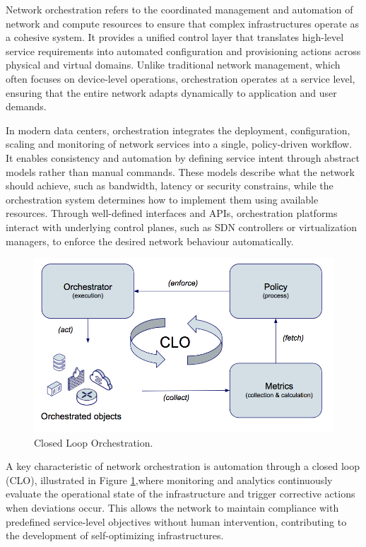 Network orchestration refers to the coordinated management and automation of network and compute resources to ensure that complex infrastructures operate as a cohesive system. It provides a unified control layer that translates high-level service requirements into automated configuration and provisioning actions across physical and virtual domains. Unlike traditional network management, which often focuses on device-level operations, orchestration operates at a service level, ensuring that the entire network adapts dynamically to application and user demands.

In modern data centers, orchestration integrates the deployment, configuration, scaling and monitoring of network services into a single, policy-driven workflow. It enables consistency and automation by defining service intent through abstract models rather than manual commands. These models describe what the network should achieve, such as bandwidth, latency or security constrains, while the orchestration system determines how to implement them using available resources. Through well-defined interfaces and APIs, orchestration platforms interact with underlying control planes, such as SDN controllers or virtualization managers, to enforce the desired network behaviour automatically.

\begin{figure}
    \vspace{-15pt}
    \centering
    \includegraphics[width=\linewidth]{Figures/orchestration.png}
    \caption{Closed Loop Orchestration. \cite{orchestration}}
    \label{closedLoop}
    \vspace{-5pt}
\end{figure}

A key characteristic of network orchestration is automation through a closed loop (CLO), illustrated in Figure \ref{closedLoop},where monitoring and analytics continuously evaluate the operational state of the infrastructure and trigger corrective actions when deviations occur. This allows the network to maintain compliance with predefined service-level objectives without human intervention, contributing to the development of self-optimizing infrastructures.

